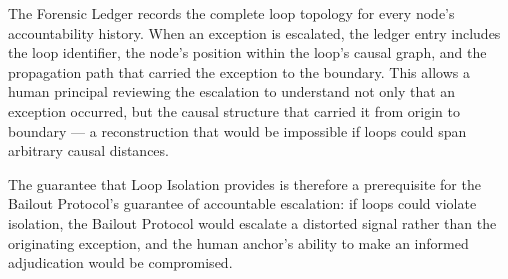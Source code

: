 The Forensic Ledger records the complete loop topology for every node's accountability history. When an exception is escalated, the ledger entry includes the loop identifier, the node's position within the loop's causal graph, and the propagation path that carried the exception to the boundary. This allows a human principal reviewing the escalation to understand not only that an exception occurred, but the causal structure that carried it from origin to boundary — a reconstruction that would be impossible if loops could span arbitrary causal distances.

The guarantee that Loop Isolation provides is therefore a prerequisite for the Bailout Protocol's guarantee of accountable escalation: if loops could violate isolation, the Bailout Protocol would escalate a distorted signal rather than the originating exception, and the human anchor's ability to make an informed adjudication would be compromised.